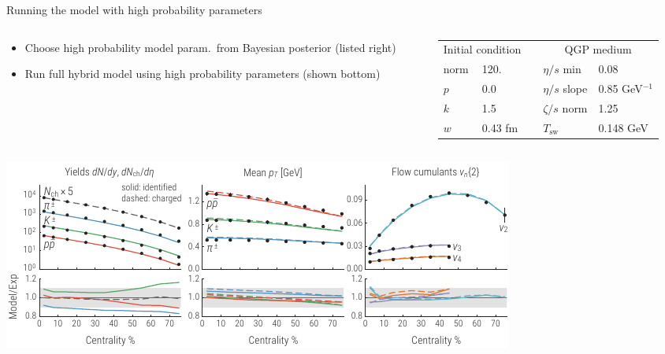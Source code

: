 \documentclass[xcolor=dvipsnames]{beamer}
\begin{document}
\begin{frame}{Running the model with high probability parameters}
    \vfill
    \centering
    \begin{columns}
        \begin{column}{0.4\textwidth}
            \scriptsize
            \begin{itemize}
                \item Choose high probability model param.\ from Bayesian posterior (listed right)
                \smallskip
                \item Run full hybrid model using high probability parameters (shown bottom)
            \end{itemize}
        \end{column}
        \begin{column}{0.6\textwidth}
            \scriptsize
            \begin{tabular}{lllll}
                \multicolumn{2}{c}{Initial condition} & & \multicolumn{2}{c}{QGP medium} \\
                \noalign{\smallskip}\hline\noalign{\medskip}
                norm & 120.          &&  $\eta/s$ min   & 0.08       \\
                $p$  & 0.0           &&  $\eta/s$ slope & 0.85 GeV$^{-1}$   \\
                $k$  & 1.5           &&  $\zeta/s$ norm & 1.25       \\
                $w$  & 0.43 fm       &&  $T_\text{sw}$  & 0.148 GeV  \\
            \end{tabular}
        \end{column}
    \end{columns}
    \vspace{0.5 cm}
    \includegraphics{mode_observables}
\end{frame}
\end{document}
